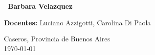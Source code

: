 \begin{titlepage}
    \thispagestyle{empty} %

    \begin{center}
    
        \vspace*{2cm}

        

        \vspace{1cm}
        {\large \textbf{\universidad}}\\
        {\large \carrera}\\
        {\large \catedra}

        \vspace{3cm}

            {\LARGE \textbf{\tituloDocumento}}

        
        \vspace{2cm}
        
        {\large \subtitulo}

        \vspace{2cm}

{\Large \textbf{\ Barbara Velazquez}}   

        \vspace{2cm}

        {\large \textbf{Docentes:} Luciano Azzigotti,
        Carolina Di Paola}\\

        \vfill

        {\large Caseros, Provincia de Buenos Aires}\\
        {\large \today}

    \end{center}
\restoregeometry %
\end{titlepage}